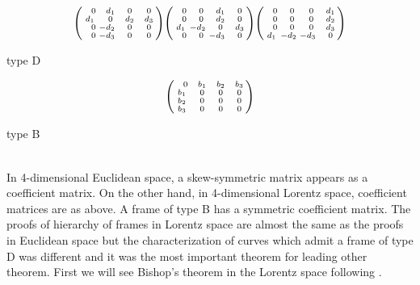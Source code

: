 \documentclass[a4paper]{amsart}
\theoremstyle{definition}
\theoremstyle{remark}
\newenvironment{psmatrix}{\left(\begin{smallmatrix}}{\end{smallmatrix}\right)}
\numberwithin{equation}{section}
\begin{document}
\begin{minipage}[b]{0.48\columnwidth}
\[\begin{psmatrix}
\phantom{-}0&\phantom{-}d_{1}&\phantom{-}0&\phantom{-}0\\
d_{1}&\phantom{-}0&\phantom{-}d_{2}&\phantom{-}d_{3}\\
\phantom{-}0&-d_{2}&\phantom{-}0&\phantom{-}0\\
\phantom{-}0&-d_{3}&\phantom{-}0&\phantom{-}0
\end{psmatrix}
\begin{psmatrix}
\phantom{-}0&\phantom{-}0&\phantom{-}d_{1}&\phantom{-}0\\
\phantom{-}0&\phantom{-}0&\phantom{-}d_{2}&\phantom{-}0\\
d_{1}&-d_{2}&\phantom{-}0&\phantom{-}d_{3}\\
\phantom{-}0&\phantom{-}0&-d_{3}&\phantom{-}0
\end{psmatrix}
\begin{psmatrix}
\phantom{-}0&\phantom{-}0&\phantom{-}0&\phantom{-}d_{1}\\
\phantom{-}0&\phantom{-}0&\phantom{-}0&\phantom{-}d_{2}\\
\phantom{-}0&\phantom{-}0&\phantom{-}0&\phantom{-}d_{3}\\
d_{1}&-d_{2}&-d_{3}&\phantom{-}0\\
\end{psmatrix}
\]
\begin{center}type D\end{center}
\end{minipage}
\begin{minipage}[b]{0.48\columnwidth}
\[\begin{psmatrix}
\phantom{-}0&\phantom{-}b_{1}&\phantom{-}b_{2}&\phantom{-}b_{3}\\
b_{1}&\phantom{-}0&\phantom{-}0&\phantom{-}0\\
b_{2}&\phantom{-}0&\phantom{-}0&\phantom{-}0\\
b_{3}&\phantom{-}0&\phantom{-}0&\phantom{-}0
\end{psmatrix}\]
\begin{center}type B\end{center}
\end{minipage}\\
In 4-dimensional Euclidean space, a skew-symmetric matrix appears as a coefficient matrix. On the other hand, in 4-dimensional Lorentz space, coefficient matrices are as above.
A frame of type B has a symmetric coefficient matrix. 
The proofs of hierarchy of frames in Lorentz space are almost the same as the proofs in Euclidean space but the characterization of curves which admit a frame of type D was different and it was the most important theorem for leading other theorem. First we will see Bishop's theorem in the Lorentz space following \cite{MR}.
\end{document}
